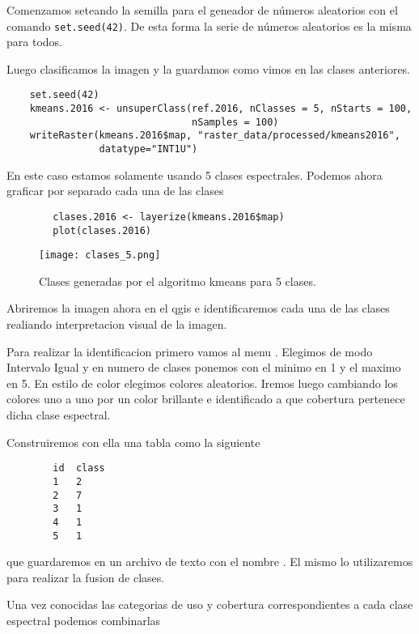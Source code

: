 \begin{exa}
    Comenzamos seteando la semilla para el geneador de n\'umeros aleatorios con el
    comando \texttt{set.seed(42)}. De esta forma la serie de n\'umeros aleatorios
    es la misma para todos.

    Luego clasificamos la imagen y la guardamos como vimos en las clases anteriores.
    \begin{lstlisting}
    set.seed(42)
    kmeans.2016 <- unsuperClass(ref.2016, nClasses = 5, nStarts = 100,
                                nSamples = 100)
    writeRaster(kmeans.2016$map, "raster_data/processed/kmeans2016",
                datatype="INT1U")
    \end{lstlisting}

    En este caso estamos solamente usando 5 clases espectrales. Podemos ahora graficar por separado cada una de las clases
    \begin{lstlisting}
        clases.2016 <- layerize(kmeans.2016$map)
        plot(clases.2016)
    \end{lstlisting}
    \begin{figure}[h!]
      \centering
      \texttt{[image: clases\_5.png]}
      \caption{Clases generadas por el algoritmo kmeans para 5 clases.}
      \label{fig:clases5}
    \end{figure}
    Abriremos la imagen ahora en el qgis e identificaremos cada una de las clases realiando interpretacion visual de la imagen.

    Para realizar la identificacion primero vamos al menu . Elegimos de modo
    Intervalo Igual y en numero de clases ponemos con el minimo en 1 y el maximo en
    5. En estilo de color elegimos colores aleatorios. Iremos luego cambiando los
    colores uno a uno por un color brillante e identificado a que cobertura
    pertenece dicha clase espectral.

    Construiremos con ella una tabla como la siguiente

    \begin{verbatim}
        id  class
        1   2
        2   7
        3   1
        4   1
        5   1
    \end{verbatim}

  que guardaremos en un archivo de texto con el nombre . El mismo lo utilizaremos para realizar
  la fusion de clases.

  Una vez conocidas las categorias de uso y cobertura correspondientes a cada
  clase espectral podemos combinarlas


\end{exa}

